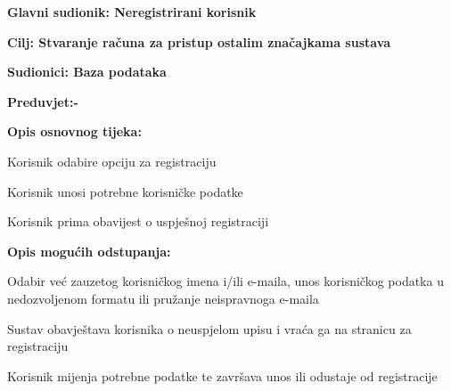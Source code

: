 	
	\noindent {}
	\begin{packed_item}
		
		\item \textbf{Glavni sudionik: Neregistrirani korisnik}
		\item  \textbf{Cilj: Stvaranje računa za pristup ostalim značajkama sustava}  
		\item  \textbf{Sudionici: Baza podataka} 
		\item  \textbf{Preduvjet:-} 
		\item  \textbf{Opis osnovnog tijeka:}
		
		\item[] \begin{packed_enum}
			
			\item Korisnik odabire opciju za registraciju
			\item Korisnik unosi potrebne korisničke podatke
			\item Korisnik prima obavijest o uspješnoj registraciji
		\end{packed_enum}
		
		\item  \textbf{Opis mogućih odstupanja:}
		
		\item[] \begin{packed_item}
			
			\item[2.a] Odabir već zauzetog korisničkog imena i/ili e-maila, unos korisničkog podatka u nedozvoljenom formatu ili pružanje neispravnoga e-maila
			\item[] \begin{packed_enum}
				
				\item  Sustav obavještava korisnika o neuspjelom upisu i vraća ga na stranicu za registraciju
				\item Korisnik mijenja potrebne podatke te završava unos ili odustaje od registracije
				
			\end{packed_enum}
			
		\end{packed_item}
	\end{packed_item}
	
